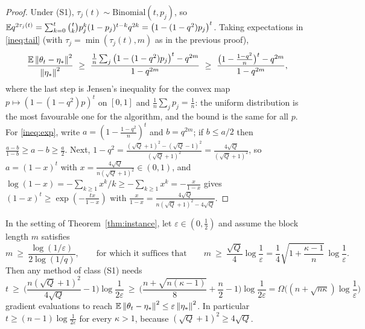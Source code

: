 \begin{proof}
Under (S1), $\tau_j(t)\sim\mathrm{Binomial}(t,p_j)$, so $\mathbb{E} q^{2\tau_j(t)}=\sum_{k=0}^t\binom tkp_j^k(1-p_j)^{t-k}q^{2k}=\big(1-(1-q^2)p_j\big)^t$. Taking expectations in \eqref{ineq:tail} (with $\tau_j=\min(\tau_j(t),m)$ as in the previous proof),
\[
\frac{\E\norm{\theta_t-\etastar}^2}{\norm{\etastar}^2}\ \ge\ \frac{\frac1n\sum_j\big(1-(1-q^2)p_j\big)^t-q^{2m}}{1-q^{2m}}\ \ge\ \frac{\big(1-\frac{1-q^2}n\big)^t-q^{2m}}{1-q^{2m}},
\]
where the last step is Jensen's inequality for the convex map $p\mapsto(1-(1-q^2)p)^t$ on $[0,1]$ and $\frac1n\sum_jp_j=\frac1n$: the uniform distribution is the most favourable one for the algorithm, and the bound is the same for all $p$. For \eqref{ineq:exp}, write $a=(1-\frac{1-q^2}n)^t$ and $b=q^{2m}$; if $b\le a/2$ then $\frac{a-b}{1-b}\ge a-b\ge\frac a2$. Next, $1-q^2=\frac{(\sqrt Q+1)^2-(\sqrt Q-1)^2}{(\sqrt Q+1)^2}=\frac{4\sqrt Q}{(\sqrt Q+1)^2}$, so $a=(1-x)^t$ with $x=\frac{4\sqrt Q}{n(\sqrt Q+1)^2}\in(0,1)$, and $\log(1-x)=-\sum_{k\ge1}x^k/k\ge-\sum_{k\ge1}x^k=-\frac x{1-x}$ gives $(1-x)^t\ge\exp(-\frac{tx}{1-x})$ with $\frac{x}{1-x}=\frac{4\sqrt Q}{n(\sqrt Q+1)^2-4\sqrt Q}$.
\end{proof}

\begin{corollary}
\label{cor:count}
In the setting of Theorem~\ref{thm:instance}, let $\varepsilon\in(0,\frac12)$ and assume the block length $m$ satisfies
\begin{equation}
\label{ineq:dim}
m\ \ge\ \frac{\log(1/\varepsilon)}{2\log(1/q)},\qquad\text{for which it suffices that}\qquad m\ \ge\ \frac{\sqrt Q}4\log\frac1\varepsilon=\frac14\sqrt{1+\frac{\kappa-1}n}\,\log\frac1\varepsilon .
\end{equation}
Then any method of class (S1) needs
\begin{equation}
\label{eq:iidcount}
t\ \ge\ \Big(\frac{n(\sqrt Q+1)^2}{4\sqrt Q}-1\Big)\log\frac1{2\varepsilon}\ \ge\ \Big(\frac{n+\sqrt{n(\kappa-1)}}{8}+\frac n2-1\Big)\log\frac1{2\varepsilon}=\Omega\Big((n+\sqrt{n\kappa})\log\frac1\varepsilon\Big)
\end{equation}
gradient evaluations to reach $\mathbb{E}\left\|\theta_t-\eta_\ast\right\|^2\le\varepsilon\left\|\eta_\ast\right\|^2$. In particular $t\ge(n-1)\log\frac1{2\varepsilon}$ for every $\kappa>1$, because $(\sqrt Q+1)^2\ge4\sqrt Q$.
\end{corollary}

